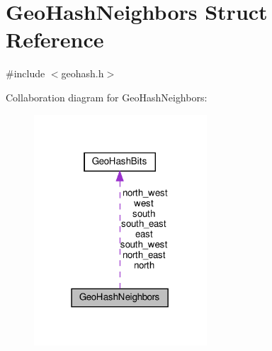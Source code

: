 \hypertarget{struct_geo_hash_neighbors}{}\section{Geo\+Hash\+Neighbors Struct Reference}
\label{struct_geo_hash_neighbors}


{\ttfamily \#include $<$geohash.\+h$>$}



Collaboration diagram for Geo\+Hash\+Neighbors\+:
\nopagebreak
\begin{figure}[H]
\begin{center}
\leavevmode
\includegraphics[width=183pt]{struct_geo_hash_neighbors__coll__graph}
\end{center}
\end{figure}
